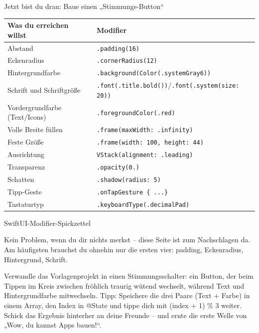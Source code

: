 \begin{tcbpractice}{Jetzt bist du dran: Baue einen „Stimmungs-Button“}

\begin{center}
\begin{tabularx}{\linewidth}{|X|X|}
\hline
\textbf{Was du erreichen willst} & \textbf{Modifier} \tabularnewline
\hline
Abstand & \texttt{.\allowbreak padding(16)} \tabularnewline
Eckenradius & \texttt{.\allowbreak cornerRadius(12)} \tabularnewline
Hintergrundfarbe & \texttt{.\allowbreak background(Color(.\allowbreak systemGray6))} \tabularnewline
Schrift und Schriftgröße & \texttt{.\allowbreak font(.\allowbreak title.\allowbreak bold())}/\texttt{.\allowbreak font(.\allowbreak system(size: 20))} \tabularnewline
Vordergrundfarbe (Text/Icons) & \texttt{.\allowbreak foregroundColor(.\allowbreak red)} \tabularnewline
Volle Breite füllen & \texttt{.\allowbreak frame(maxWidth: .\allowbreak infinity)} \tabularnewline
Feste Größe & \texttt{.\allowbreak frame(width: 100, height: 44)} \tabularnewline
Ausrichtung & \texttt{VStack(alignment: .\allowbreak leading)} \tabularnewline
Transparenz & \texttt{.\allowbreak opacity(0.\allowbreak 6)} \tabularnewline
Schatten & \texttt{.\allowbreak shadow(radius: 5)} \tabularnewline
Tipp-Geste & \texttt{.\allowbreak onTapGesture \{ .\allowbreak .\allowbreak .\allowbreak  \}} \tabularnewline
Tastaturtyp & \texttt{.\allowbreak keyboardType(.\allowbreak decimalPad)} \tabularnewline
\hline
\end{tabularx}
\end{center}

\begin{center}\small\color{gray}SwiftUI-Modifier-Spickzettel\end{center}

Kein Problem, wenn du dir nichts merkst – diese Seite ist zum Nachschlagen da. Am häufigsten brauchst du ohnehin nur die ersten vier: padding, Eckenradius, Hintergrund, Schrift.

Verwandle das Vorlagenprojekt in einen Stimmungsschalter: ein Button, der beim Tippen im Kreis zwischen fröhlich traurig wütend wechselt, während Text und Hintergrundfarbe mitwechseln. Tipp: Speichere die drei Paare (Text + Farbe) in einem Array, den Index in @State und tippe dich mit (index + 1) \% 3 weiter. Schick das Ergebnis hinterher an deine Freunde – und ernte die erste Welle von „Wow, du kannst Apps bauen!“.

\end{tcbpractice}

